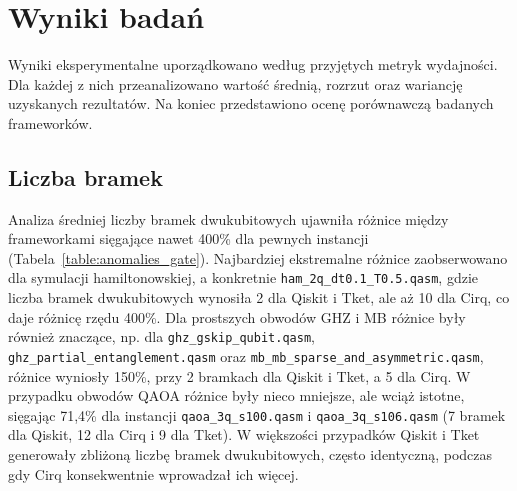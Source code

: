 \section{Wyniki badań}
\label{sec:results}

Wyniki eksperymentalne uporządkowano według przyjętych metryk wydajności. Dla każdej z nich przeanalizowano wartość średnią, rozrzut oraz wariancję uzyskanych rezultatów. Na koniec przedstawiono ocenę porównawczą badanych frameworków.

\subsection{Liczba bramek}

Analiza średniej liczby bramek dwukubitowych ujawniła różnice między frameworkami sięgające nawet 400\% dla pewnych instancji (Tabela~\ref{table:anomalies_gate}). Najbardziej ekstremalne różnice zaobserwowano dla symulacji hamiltonowskiej, a konkretnie \texttt{ham\_2q\_dt0.1\_T0.5.qasm}, gdzie liczba bramek dwukubitowych wynosiła 2 dla Qiskit i Tket, ale aż 10 dla Cirq, co daje różnicę rzędu 400\%.
Dla prostszych obwodów GHZ i MB różnice były również znaczące, np. dla \texttt{ghz\_gskip\_qubit.qasm}, \texttt{ghz\_partial\_entanglement.qasm} oraz \texttt{mb\_mb\_sparse\_and\_asymmetric\-.qasm}, różnice wyniosły 150\%, przy 2 bramkach dla Qiskit i Tket, a 5 dla Cirq.
W przypadku obwodów QAOA różnice były nieco mniejsze, ale wciąż istotne, sięgając 71,4\% dla instancji \texttt{qaoa\_3q\_s100.qasm} i \texttt{qaoa\_3q\_s106.qasm} (7 bramek dla Qiskit, 12 dla Cirq i 9 dla Tket). W większości przypadków Qiskit i Tket generowały zbliżoną liczbę bramek dwukubitowych, często identyczną, podczas gdy Cirq konsekwentnie wprowadzał ich więcej.


